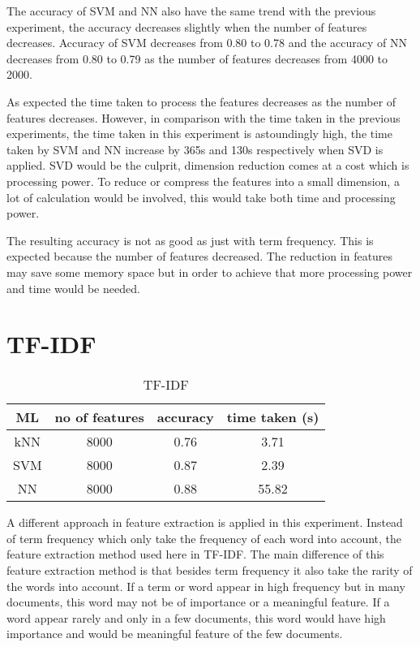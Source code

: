 The accuracy of SVM and NN also have the same trend with the previous experiment, the accuracy decreases slightly when the number of features decreases. Accuracy of SVM decreases from 0.80 to 0.78 and the accuracy of NN decreases from 0.80 to 0.79 as the number of features decreases from 4000 to 2000.

As expected the time taken to process the features decreases as the number of features decreases. However, in comparison with the time taken in the previous experiments, the time taken in this experiment is astoundingly high, the time taken by SVM and NN increase by 365s and 130s respectively when SVD is applied. SVD would be the culprit, dimension reduction comes at a cost which is processing power. To reduce or compress the features into a small dimension, a lot of calculation would be involved, this would take both time and processing power.

The resulting accuracy is not as good as just with term frequency. This is expected because the number of features decreased. The reduction in features may save some memory space but in order to achieve that more processing power and time would be needed.

\clearpage
\section{TF-IDF}

\begin{table} [ht]
	\centering
	\begin{tabular}{|| c | c | c | c||}
		\hline
		ML & no of features & accuracy & time taken (s) \\ [0.5ex]
		\hline\hline
		kNN & 8000 & 0.76 & 3.71 \\ 
		\hline
		SVM & 8000 & 0.87 & 2.39 \\
		\hline
		NN & 8000 & 0.88 & 55.82 \\
		\hline
	\end{tabular}
\caption{TF-IDF}
\label{tbl:tfidf}
\end{table}

A different approach in feature extraction is applied in this experiment. Instead of term frequency which only take the frequency of each word into account, the feature extraction method used here in TF-IDF. The main difference of this feature extraction method is that besides term frequency it also take the rarity of the words into account. If a term or word appear in high frequency but in many documents, this word may not be of importance or a meaningful feature. If a word appear rarely and only in a few documents, this word would have high importance and would be meaningful feature of the few documents.

